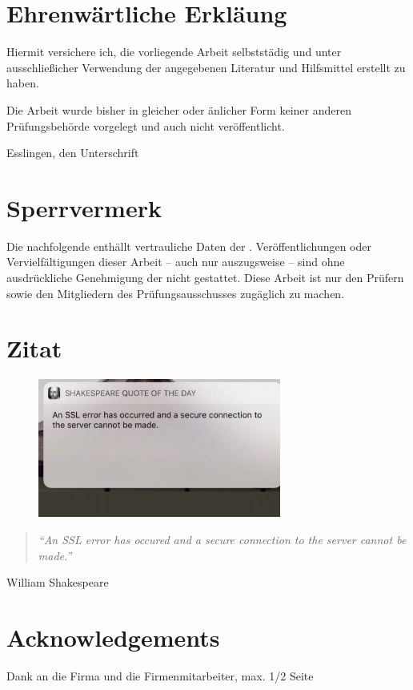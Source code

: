 \chapter*{Ehrenwärtliche Erkläung}

Hiermit versichere ich, die vorliegende Arbeit selbststädig und unter ausschließicher Verwendung der angegebenen Literatur und Hilfsmittel erstellt zu haben.

Die Arbeit wurde bisher in gleicher oder änlicher Form keiner anderen Prüfungsbehörde vorgelegt und auch nicht veröffentlicht.

\hrulefill

Esslingen, den \workDate \hspace*{\fill} Unterschrift


\newpage
%
\chapter*{Sperrvermerk} %

Die nachfolgende \workType enthällt vertrauliche Daten der \workComany.
Veröffentlichungen oder Vervielfältigungen dieser Arbeit -- auch nur auszugsweise -- sind ohne ausdrückliche Genehmigung der \workComany nicht gestattet.
Diese Arbeit ist nur den Prüfern sowie den Mitgliedern des Prüfungsausschusses zugäglich zu machen.
\newpage
%
\chapter*{Zitat} %
\begin{center}
\begin{figure}[ht]
  \centering
  \includegraphics[width=8cm]{assets/shakespeare.jpeg}
\end{figure}

\begin{minipage}{12cm}
\begin{quotation}
\textit{\enquote{An SSL error has occured and a secure connection to the server cannot be made.}}
\end{quotation}
\hfill \textsf William Shakespeare
\end{minipage}
\end{center}
\newpage{}
%
\chapter*{Acknowledgements} %

Dank an die Firma und die Firmenmitarbeiter, max. 1/2 Seite

\newpage
